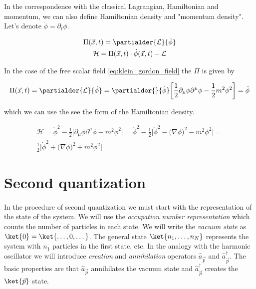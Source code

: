 In the correspondence with the classical Lagrangian, Hamiltonian and momentum, we can also define Hamiltonian density and "momentum density". Let's 
denote $\dot{\phi} = \partial_{t} \phi$. 

\begin{equation*}
    \begin{gathered}
        \Pi(\vec{x}, t) = \partialder{\mathcal{L}}{\dot{\phi}} \\
        \mathcal{H} = \Pi(\vec{x}, t) \cdot \dot{\phi}(\vec{x}, t) - \mathcal{L}
    \end{gathered}
\end{equation*}

In the case of the free scalar field \ref{eq:klein_gordon_field} the $\Pi$ is given by

\begin{equation*}
    \begin{gathered}
        \Pi(\vec{x}, t) = \partialder{\mathcal{L}}{\dot{\phi}} = \partialder{}{\dot{\phi}} \bigg[\frac{1}{2} \partial_{\mu} \phi \partial^{\mu} \phi - \frac{1}{2} m^{2} \phi^{2}\bigg]
        = \dot{\phi}
    \end{gathered}
\end{equation*}

which we can use the see the form of the Hamiltonian density.

\begin{equation*}
    \begin{gathered}
        \mathcal{H} = \dot{\phi}^{2} - \frac{1}{2}\bigg[\partial_{\mu} \phi \partial^{\mu} \phi - m^{2} \phi^{2}\bigg] = 
        \dot{\phi}^{2} - \frac{1}{2}\bigg[\dot{\phi}^{2} - \big(\nabla \phi\big)^{2} - m^{2} \phi^{2}\bigg] = \\
        \frac{1}{2}\bigg[\dot{\phi}^{2} + \big(\nabla \phi\big)^{2} + m^{2} \phi^{2}\bigg]
    \end{gathered}
\end{equation*}

\section{Second quantization}

\paragraph{} In the procedure of second quantization we must start with the representation of the state of the system. We
will use the \textit{occupation number representation} which counts the number of particles in each state. We
will write the \textit{vacuum state} as $\ket{0} = \ket{\dots, 0, \dots}$. The general state $\ket{n_{1}, \dots, n_{N}}$
represents the system with $n_{1}$ particles in the first state, etc. In the analogy with the harmonic oscillator we will
introduce \textit{creation} and \textit{annihilation} operators $\hat{a}_{\vec{p}}$ and $\hat{a}^{\dagger}_{\vec{p}}$.
The basic properties are that $\hat{a}_{\vec{p}}$ annihilates the vacuum state and $\hat{a}^{\dagger}_{\vec{p}}$ creates
the $\ket{\vec{p}}$ state.


